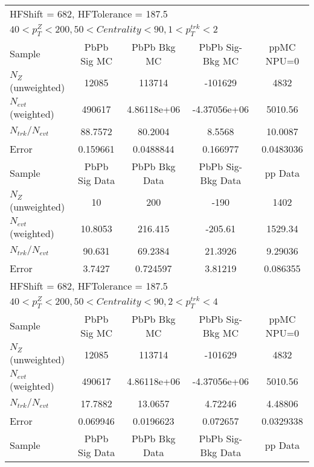 \clearpage
\begin{table}[h!]
\centering
\begin{tabular}{|l|c|c|c|c|}
\multicolumn{5}{l}{ HFShift = 682, HFTolerance = 187.5}\\
\multicolumn{5}{l}{ $40 < p_{T}^{Z} < 200, 50 < Centrality < 90, 1 < p_{T}^{trk} < 2$}\\
\hline\hline
Sample         & PbPb Sig MC    & PbPb Bkg MC    & PbPb Sig-Bkg MC& ppMC NPU=0     \\
$N_Z$ (unweighted)& 12085          & 113714         & -101629        & 4832           \\
$N_{evt}$ (weighted)& 490617         & 4.86118e+06    & -4.37056e+06   & 5010.56        \\
$N_{trk}/N_{evt}$& 88.7572        & 80.2004        & 8.5568         & 10.0087        \\
Error          & 0.159661       & 0.0488844      & 0.166977       & 0.0483036      \\
\hline
Sample         & PbPb Sig Data  & PbPb Bkg Data  & PbPb Sig-Bkg Data& pp Data  \\
$N_Z$ (unweighted)& 10             & 200            & -190           & 1402           \\
$N_{evt}$ (weighted)& 10.8053        & 216.415        & -205.61        & 1529.34        \\
$N_{trk}/N_{evt}$& 90.631         & 69.2384        & 21.3926        & 9.29036        \\
Error          & 3.7427         & 0.724597       & 3.81219        & 0.086355       \\
\hline\hline
\multicolumn{5}{l}{ HFShift = 682, HFTolerance = 187.5}\\
\multicolumn{5}{l}{ $40 < p_{T}^{Z} < 200, 50 < Centrality < 90, 2 < p_{T}^{trk} < 4$}\\
\hline\hline
Sample         & PbPb Sig MC    & PbPb Bkg MC    & PbPb Sig-Bkg MC& ppMC NPU=0     \\
$N_Z$ (unweighted)& 12085          & 113714         & -101629        & 4832           \\
$N_{evt}$ (weighted)& 490617         & 4.86118e+06    & -4.37056e+06   & 5010.56        \\
$N_{trk}/N_{evt}$& 17.7882        & 13.0657        & 4.72246        & 4.48806        \\
Error          & 0.069946       & 0.0196623      & 0.072657       & 0.0329338      \\
\hline
Sample         & PbPb Sig Data  & PbPb Bkg Data  & PbPb Sig-Bkg Data& pp Data  \\

\end{tabular}
\end{table}
